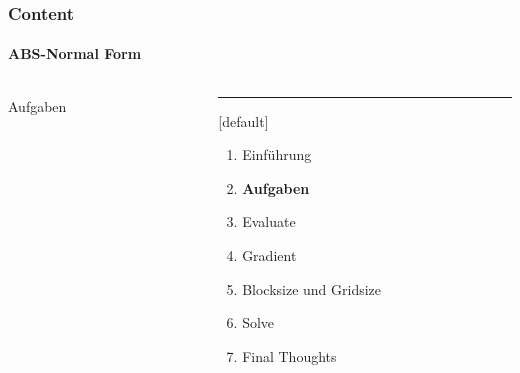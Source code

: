 \begin{frame}
	\frametitle{Content}
	\framesubtitle{ABS-Normal Form}
	\begin{columns}[T] %
		\begin{column}{.48\textwidth}
			
			\begin{center}
				{\Huge Aufgaben}
			\end{center}
			
		\end{column}%
		\hfill%
		\begin{column}{.48\textwidth}
			\color{blue}\rule{\linewidth}{4pt}
			
			\begin{enumerate}
				\item Einführung
				\item \textbf{Aufgaben}
				\item Evaluate
				\item Gradient
				\item Blocksize und Gridsize
				\item Solve
				\item Final Thoughts
			\end{enumerate}
		\end{column}%
	\end{columns}
\end{frame}

